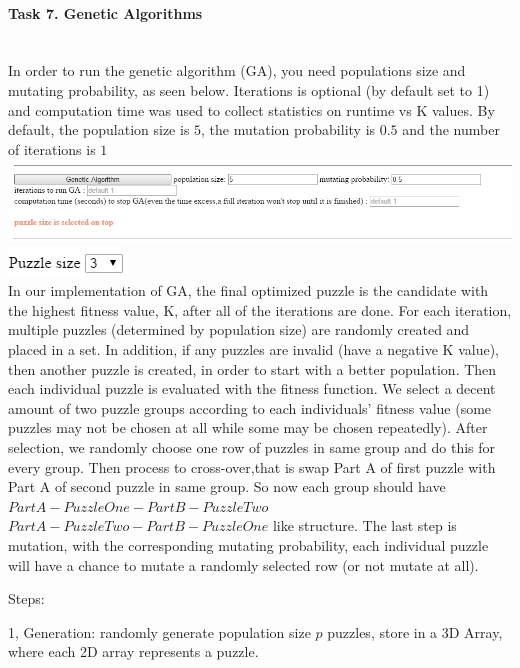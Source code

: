 \documentclass[12pt, letterpaper]{article}
\begin{document}
\pagebreak
\paragraph{Task 7. Genetic Algorithms} \mbox{}\\

In order to run the genetic algorithm (GA), you need populations size and mutating probability, as seen below. Iterations is optional (by default set to 1) and computation time was used to collect statistics on runtime vs K values. By default, the population size is $5$, the mutation probability is $0.5$ and the number of iterations is $1$ \\

\includegraphics[scale=0.6]{"Task 7/GA-section"}
\includegraphics[scale=0.6]{"Task 7/Puzzle-size"}\\

In our implementation of GA, the final optimized puzzle is the candidate with the highest fitness value, K, after all of the iterations are done. For each iteration, multiple puzzles (determined by population size) are randomly created and placed in a set. In addition, if any puzzles are invalid (have a negative K value), then another puzzle is created, in order to start with a better population. Then each individual puzzle is evaluated with the fitness function. We select a decent amount of two puzzle groups according to each individuals' fitness value (some puzzles may not be chosen at all while some may be chosen repeatedly). After selection, we randomly choose one row of puzzles in same group and do this for every group. Then process to cross-over,that is swap Part A of first puzzle with Part A of second puzzle in same group. So now each group should have $PartA-PuzzleOne-PartB-PuzzleTwo$ $PartA-PuzzleTwo-PartB-PuzzleOne$ like structure. The last step is mutation, with the corresponding mutating probability, each individual puzzle will have a chance to mutate a randomly selected row (or not mutate at all).

\bigskip
\noindent Steps:

1, Generation: randomly generate population size $p$ puzzles, store in a 3D Array, where each 2D array represents a puzzle.\\
\end{document}
